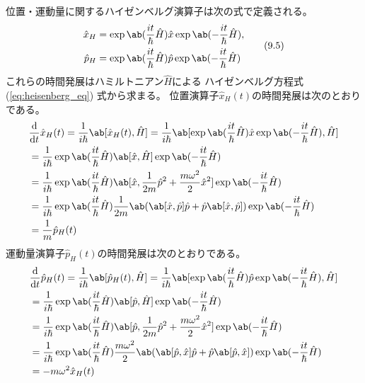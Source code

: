 位置・運動量に関するハイゼンベルグ演算子は次の式で定義される。
\begin{equation}
  \begin{split}
    \hat{x}_H
    &=\exp\ab(\frac{it}{\hbar}\hat{H})\hat{x}\exp\ab(-\frac{it}{\hbar}\hat{H}), \\
    \hat{p}_H
    &=\exp\ab(\frac{it}{\hbar}\hat{H})\hat{p}\exp\ab(-\frac{it}{\hbar}\hat{H})
  \end{split}
  \tag{9.5}
\end{equation}
これらの時間発展はハミルトニアン$\hat{H}$による
ハイゼンベルグ方程式 (\ref{eq:heisenberg_eq}) 式から求まる。
位置演算子$\hat{x}_H(t)$の時間発展は次のとおりである。
\begin{equation}
  \begin{split}
    &\odv{}{t}\hat{x}_H(t)
    =\frac{1}{i\hbar}\ab[\hat{x}_H(t),\hat{H}]
    =\frac{1}{i\hbar}
    \ab[
      \exp\ab(\frac{it}{\hbar}\hat{H})
      \hat{x}
      \exp\ab(-\frac{it}{\hbar}\hat{H}),
      \hat{H}
    ] \\
    &=\frac{1}{i\hbar}
    \exp\ab(\frac{it}{\hbar}\hat{H})
    \ab[\hat{x},\hat{H}]
    \exp\ab(-\frac{it}{\hbar}\hat{H})
    \\
    &=\frac{1}{i\hbar}
    \exp\ab(\frac{it}{\hbar}\hat{H})
    \ab[
      \hat{x},\frac{1}{2m}\hat{p}^2+\frac{m\omega^2}{2}\hat{x}^2
    ]
    \exp\ab(-\frac{it}{\hbar}\hat{H})
    \\
    &=\frac{1}{i\hbar}
    \exp\ab(\frac{it}{\hbar}\hat{H})
    \frac{1}{2m}
    \ab(\ab[\hat{x},\hat{p}]\hat{p}+\hat{p}\ab[\hat{x},\hat{p}])
    \exp\ab(-\frac{it}{\hbar}\hat{H})\\
    &=\frac{1}{m}\hat{p}_H(t)
  \end{split}
\end{equation}
運動量演算子$\hat{p}_H(t)$の時間発展は次のとおりである。
\begin{equation}
  \begin{split}
    &\odv{}{t}\hat{p}_H(t)
    =\frac{1}{i\hbar}\ab[\hat{p}_H(t),\hat{H}]
    =\frac{1}{i\hbar}
    \ab[
      \exp\ab(\frac{it}{\hbar}\hat{H})
      \hat{p}
      \exp\ab(-\frac{it}{\hbar}\hat{H}),
      \hat{H}
    ] \\
    &=\frac{1}{i\hbar}
    \exp\ab(\frac{it}{\hbar}\hat{H})
    \ab[\hat{p},\hat{H}]
    \exp\ab(-\frac{it}{\hbar}\hat{H})
    \\
    &=\frac{1}{i\hbar}
    \exp\ab(\frac{it}{\hbar}\hat{H})
    \ab[
      \hat{p},\frac{1}{2m}\hat{p}^2+\frac{m\omega^2}{2}\hat{x}^2
    ]
    \exp\ab(-\frac{it}{\hbar}\hat{H})
    \\
    &=\frac{1}{i\hbar}
    \exp\ab(\frac{it}{\hbar}\hat{H})
    \frac{m\omega^2}{2}
    \ab(\ab[\hat{p},\hat{x}]\hat{p}+\hat{p}\ab[\hat{p},\hat{x}])
    \exp\ab(-\frac{it}{\hbar}\hat{H})\\
    &=-m\omega^2\hat{x}_H(t)
  \end{split}
\end{equation}
